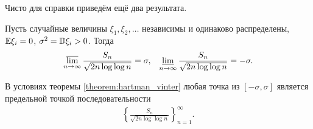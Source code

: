 \documentclass[../main.tex]{subfiles}
\begin{document}
Чисто для справки приведём ещё два результата.

\begin{thm}
 \label{theorem:hartman_vinter}
 Пусть случайные величины $ \xi_1, \xi_2, \ldots $ независимы и одинаково распределены, $ \mathbb E \xi_i = 0 $, $ \sigma^{2} = \mathbb D \xi_i > 0 $. Тогда
 \begin{align*}
  \varlimsup_{n \to \infty} \frac{S_n}{\sqrt{2n \log\log n}} = \sigma,&&
  \varliminf_{n \to \infty} \frac{S_n}{\sqrt{2n \log\log n}} = -\sigma.
 \end{align*}
\end{thm}

\begin{thm}[Штрассен]
 В условиях теоремы \ref{theorem:hartman_vinter} любая точка из $ [-\sigma, \sigma] $ является предельной точкой последовательности
 \begin{align*}
  \left\{\frac{S_n}{\sqrt{2 n \log \log n}} \right\}_{n=1}^{\infty}.
 \end{align*}
\end{thm}
\end{document}
